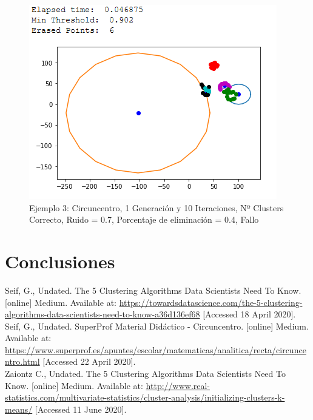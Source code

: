 \documentclass[conference,a4paper]{IEEEtran}
\begin{document}
\begin{figure}[H]
\centering
\includegraphics[scale=0.65]{Experimentacion/Ejemplo3/ej3_c_1_10_re_wrong}
\caption{Ejemplo 3: Circuncentro, 1 Generación y 10 Iteraciones,  Nº Clusters Correcto, Ruido = 0.7, Porcentaje de eliminación = 0.4, Fallo\\}
\end{figure}

\clearpage
\section{Conclusiones}


\clearpage
\begin{thebibliography}{9}
	
	\label{bib:georgeSeif}
	Seif, G., Undated. The 5 Clustering Algorithms Data Scientists Need To Know. [online] Medium. 
	Available at: \href{https://towardsdatascience.com/the-5-clustering-algorithms-data-scientists-need-to-know-a36d136ef68}{https://towardsdatascience.com/the-5-clustering-algorithms-data-scientists-need-to-know-a36d136ef68}
	[Accessed 18 April 2020].\\

	\label{bib:georgeSeif2}
	Seif, G., Undated. SuperProf Material Didáctico - Circuncentro. [online] Medium. 
	Available at: \href{https://www.superprof.es/apuntes/escolar/matematicas/analitica/recta/circuncentro.html}{https://www.superprof.es/apuntes/escolar/matematicas/analitica/recta/circuncentro.html}
	[Accessed 22 April 2020].\\
	
	\label{bib:clustering}
	Zaiontz C., Undated. The 5 Clustering Algorithms Data Scientists Need To Know. [online] Medium. 
	Available at: \href{ http://www.real-statistics.com/multivariate-statistics/cluster-analysis/initializing-clusters-k-means/}{ http://www.real-statistics.com/multivariate-statistics/cluster-analysis/initializing-clusters-k-means/}
	[Accessed 11 June 2020].

\end{thebibliography}
\end{document}

